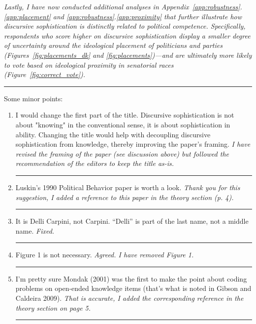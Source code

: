 \textit{Lastly, I have now conducted additional analyses in Appendix~\ref{app:robustness}.\ref{app:placement} and \ref{app:robustness}.\ref{app:proximity} that further illustrate how discursive sophistication is distinctly related to {\normalfont political} competence. Specifically, respondents who score higher on discursive sophistication display a smaller degree of uncertainty around the ideological placement of politicians and parties (Figures~\ref{fig:placements_dk} and \ref{fig:placements})---and are ultimately more likely to vote based on ideological proximity in senatorial races (Figure~\ref{fig:correct_vote}).}


\rule{\linewidth}{.01cm}

Some minor points:\vspace{-1em}
\begin{enumerate}
\item I would change the first part of the title. Discursive sophistication is not about "knowing" in the conventional sense, it is about sophistication in ability. Changing the title would help with decoupling discursive sophistication from knowledge, thereby improving the paper's framing.
\vspace{.5em}\newline\textit{I have revised the framing of the paper (see discussion above) but followed the recommendation of the editors to keep the title as-is.}\newline\rule{\linewidth}{.01cm}
\item Luskin's 1990 Political Behavior paper is worth a look.
\vspace{.5em}\newline\textit{Thank you for this suggestion, I added a reference to this paper in the theory section (p. 4).}\newline\rule{\linewidth}{.01cm}
\item It is Delli Carpini, not Carpini. ``Delli'' is part of the last name, not a middle name.
\vspace{.5em}\newline\textit{Fixed.}\newline\rule{\linewidth}{.01cm}
\item Figure 1 is not necessary.
\vspace{.5em}\newline\textit{Agreed. I have removed Figure 1.}\newline\rule{\linewidth}{.01cm}
\item I'm pretty sure Mondak (2001) was the first to make the point about coding problems on open-ended knowledge items (that's what is noted in Gibson and Caldeira 2009).
\vspace{.5em}\newline\textit{That is accurate, I added the corresponding reference in the theory section on page 5.}\newline\rule{\linewidth}{.01cm}
\end{enumerate}

